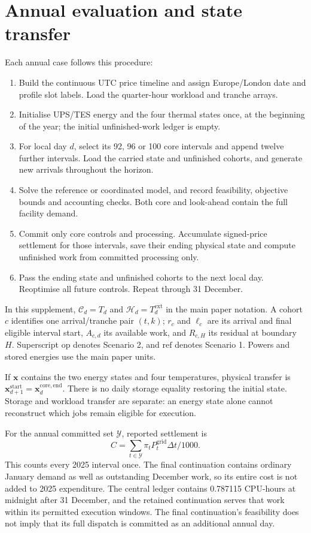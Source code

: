\section{Annual evaluation and state transfer}
Each annual case follows this procedure:
\begin{enumerate}
\item Build the continuous UTC price timeline and assign Europe/London date and \textcolor{LatestGreen}{profile slot} labels. Load the quarter-hour workload and tranche arrays.
\item Initialise UPS/TES energy and the four thermal states once, at the beginning of the year; the initial unfinished-work ledger is empty.
\item For local day $d$, select its 92, 96 or 100 core intervals and append twelve further intervals. Load the carried state and unfinished cohorts, and generate new arrivals throughout the horizon.
\item Solve the reference or coordinated model, and record feasibility, objective bounds and accounting checks. Both core and look-ahead contain the full facility demand.
\item Commit only core controls and processing. Accumulate signed-price settlement for those intervals, save their ending physical state and compute unfinished work from committed processing only.
\item Pass the ending state and unfinished cohorts to the next local day. Reoptimise all future controls. Repeat through 31 December.
\end{enumerate}
In this supplement, $\mathcal C_d=T_d$ and $\mathcal H_d=T_d^{\mathrm{ext}}$ in the \textcolor{LatestGreen}{main paper} notation. A cohort $c$ identifies one arrival/tranche pair $(t,k)$; $r_c$ and $\ell_c$ are its arrival and final eligible interval start, $A_{c,d}$ its available work, and $R_{c,H}$ its residual at boundary $H$. Superscript $\mathrm{op}$ denotes Scenario 2, and $\mathrm{ref}$ denotes Scenario 1. Powers and stored energies use the \textcolor{LatestGreen}{main paper} units.

If $\boldsymbol x$ contains the two energy states and four temperatures, physical transfer is $\boldsymbol x_{d+1}^{\mathrm{start}}=\boldsymbol x_d^{\mathrm{core,end}}$. There is no daily storage equality restoring the initial state. Storage and workload transfer are separate: an energy state alone cannot reconstruct which jobs remain eligible for execution.

\textcolor{LatestGreen}{For the annual committed set} $\mathcal Y$, reported settlement is
\begin{equation}
C=\sum_{t\in\mathcal Y}\pi_tP_t^{\mathrm{grid}}\Delta t/1000.
\end{equation}
This counts every 2025 interval once. The final continuation contains ordinary January demand as well as outstanding December work, so its entire cost is not added to 2025 expenditure. The central ledger contains 0.787115 CPU-hours at midnight after 31 December, and the retained continuation serves that work within its permitted execution windows. The final continuation's feasibility does not imply that its full dispatch is committed as an additional annual day.

